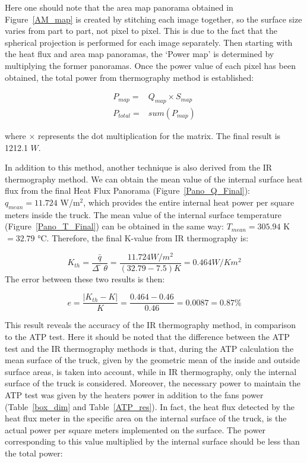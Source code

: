 \documentclass{tQRT2e}
\begin{document}
Here one should note that the area map panorama obtained in Figure~\ref{AM_map} is created by stitching each image together, so the surface size varies from part to part, not pixel to pixel. This is due to the fact that the spherical projection is performed for each image separately.
Then starting with the heat flux and area map panoramas, the ‘Power map’ is determined by multiplying the former panoramas. Once the power value of each pixel has been obtained, the total power from thermography method is established:

\begin{align}
P_{map} =& Q_{map}×S_{map}  \\
P_{total} =& sum(P_{map})  
\end{align}

where $ × $ represents the dot multiplication for the matrix. The final result is 1212.1 $ W $.

In addition to this method, another technique is also derived from the IR thermography method. We can obtain the mean value of the internal surface heat flux from the final Heat Flux Panorama (Figure~\ref{Pano_Q_Final}): $q_{mean} = 11.724$  W/m$^2 $, which provides the entire internal heat power per square meters inside the truck. The mean value of the internal surface temperature (Figure~\ref{Pano_T_Final}) can be obtained in the same way: $ T_{mean} = 305.94$ K $= 32.79$ °C.
 Therefore, the final K-value from IR thermography is:

\begin{equation}
K_{th}=\frac{\bar{q}}{\Delta ̅\theta} =\frac{11.724 W/m^2}{(32.79-7.5) K}=0.464 W/K m^2 
\end{equation}
The error between these two results is then:

\begin{equation}
e=  \frac{|K_{th}-K|}{K}=\frac{0.464-0.46}{0.46}=0.0087=0.87\%
\end{equation}

This result reveals the accuracy of the IR thermography method, in comparison to the ATP test. Here it should be noted that the difference between the ATP test and the IR thermography methods is that, during the ATP calculation the mean surface of the truck, given by the geometric mean of the inside and outside surface areas, is taken into account, while in IR thermography, only the internal surface of the truck is considered. Moreover, the necessary power to maintain the ATP test was given by the heaters power in addition to the fans power (Table~\ref{box_dim} and Table~\ref{ATP_res}). In fact, the heat flux detected by the heat flux meter in the specific area on the internal surface of the truck, is the actual power per square meters implemented on the surface. The power corresponding to this value multiplied by the internal surface should be less than the total power:
\end{document}
